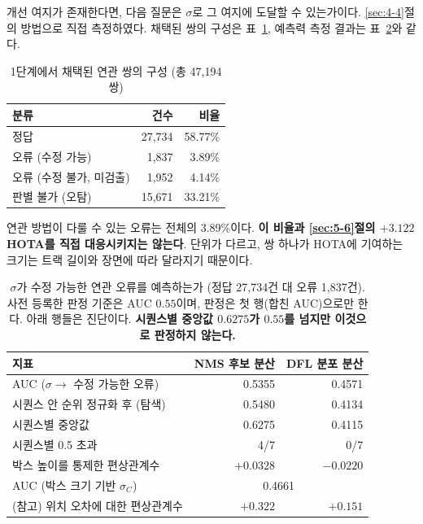\documentclass[12pt,a4paper,oneside]{report}
\begin{document}
개선 여지가 존재한다면, 다음 질문은 $\sigma$로 그 여지에 도달할 수 있는가이다. \ref{sec:4-4}절의 방법으로 직접 측정하였다. 채택된 쌍의 구성은 표~\ref{tab:pairs}, 예측력 측정 결과는 표~\ref{tab:auc}와 같다.

\begin{table}[htbp]
\centering
\small
\caption{1단계에서 채택된 연관 쌍의 구성 (총 47{,}194쌍)}
\label{tab:pairs}
\begin{tabular}{lrr}
\toprule
\textbf{분류} & 건수 & 비율 \\
\midrule
정답 & 27{,}734 & 58.77\% \\
오류 (수정 가능) & 1{,}837 & 3.89\% \\
오류 (수정 불가, 미검출) & 1{,}952 & 4.14\% \\
판별 불가 (오탐) & 15{,}671 & 33.21\% \\
\bottomrule
\end{tabular}
\end{table}

연관 방법이 다룰 수 있는 오류는 전체의 3.89\%이다. \textbf{이 비율과 \ref{sec:5-6}절의 $+3.122$ HOTA를 직접 대응시키지는 않는다}. 단위가 다르고, 쌍 하나가 HOTA에 기여하는 크기는 트랙 길이와 장면에 따라 달라지기 때문이다.

\begin{table}[htbp]
\centering
\small
\caption{$\sigma$가 수정 가능한 연관 오류를 예측하는가 (정답 27{,}734건 대 오류 1{,}837건). 사전 등록한 판정 기준은 AUC $0.55$이며, 판정은 첫 행(합친 AUC)으로만 한다. 아래 행들은 진단이다. \textbf{시퀀스별 중앙값 $0.6275$가 $0.55$를 넘지만 이것으로 판정하지 않는다.}}
\label{tab:auc}
\begin{tabular}{lrr}
\toprule
지표 & NMS 후보 분산 & DFL 분포 분산 \\
\midrule
AUC ($\sigma \rightarrow$ 수정 가능한 오류) & 0.5355 & 0.4571 \\
\quad 시퀀스 안 순위 정규화 후 (탐색) & 0.5480 & 0.4134 \\
\quad 시퀀스별 중앙값 & 0.6275 & 0.4115 \\
\quad 시퀀스별 0.5 초과 & 4/7 & 0/7 \\
\midrule
박스 높이를 통제한 편상관계수 & $+0.0328$ & $-0.0220$ \\
AUC (박스 크기 기반 $\sigma_C$) & \multicolumn{2}{c}{0.4661} \\
\midrule
(참고) 위치 오차에 대한 편상관계수 & $+0.322$ & $+0.151$ \\
\bottomrule
\end{tabular}
\end{table}
\end{document}
